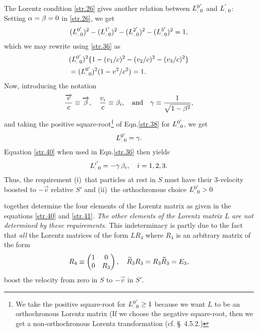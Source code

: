 \begin{small}
The Lorentz condition \eqref{str.26} gives another 
relation between ${{L}^{0'}_{.\;0}}$ and ${{L}^{'}_{.\;0}}$: 
Setting ${\alpha}={\beta}=0$ in \eqref{str.26}, we get
\begin{align}\label{str.37}
 ({{L}^{0'}_{.\;0}})^2
-({{L}^{1'}_{.\;0}})^2-({{L}^{2'}_{.\;0}})^2
-({{L}^{3'}_{.\;0}})^2=1,
\end{align}
which we may rewrite using \eqref{str.36} as
\begin{align}\label{str.38}
&({{L}^{0'}_{.\;0}})^2 
\{1-(v_1/c)^2-(v_2/c)^2-(v_3/c)^2\}\notag\\
&=({{L}^{0'}_{.\;0}})^2 (1-v^2/c^2)=1.
\end{align}
Now, introducing the notation
\begin{align}\label{str.39}
\frac{\overrightarrow{v}}{c}\equiv \overrightarrow{{\beta}},  \quad
\frac{v_i}{c} \equiv{\beta}_i, \quad \text{and} \quad 
{\gamma}\equiv \frac{1}{\sqrt{1-{\beta}^2}},
\end{align}
and taking the positive square-root\footnote{We take the 
positive square-root for ${{L}^{0'}_{.\;0}}\geq1$ because we 
want $L$ to be an orthochronous Lorentz matrix (If we 
choose the negative square-root, then we get a 
non-orthochronous Lorentz transformation (cf. \S~4.5.2.)} 
of Eqn.\eqref{str.38} for 
${{L}^{0'}_{.\;0}}$, we get
\begin{align}\label{str.40}
{\ensuremath{{L}^{0'}_{.\;0}}}={\gamma}.
\end{align} 
Equation \eqref{str.40} when used in Eqn.\eqref{str.36} 
then yields
\begin{align}\label{str.41}
{\ensuremath{{L}^{i'}_{.\;0}}} =-{\gamma}\,{\beta}_i,\quad i=1,2,3.
\end{align}
Thus, the  requirement (i)~that particles at rest in  $S$ 
must have their 3-velocity boosted to $-\vec{v}$ relative  
$S'$ and (ii)~the orthochronous choice  ${{L}^{0'}_{.\;0}}>0$ 
 
together determine the four elements of the Lorentz matrix 
as given in the equations \eqref{str.40} and 
\eqref{str.41}. 
\textsl{The other elements of the Lorentz matrix $L$ 
are \textsl{not} determined by these requirements.} This 
indeterminacy is partly due to the fact that \textsl{all} 
the Lorentz matrices of the form $LR_4$ where $R_4$ is an 
arbitrary matrix of the form
\begin{align}\label{str.42}
R_4 \equiv\begin{pmatrix}
1&0\\0&R_3\end{pmatrix},
\quad \widetilde{R}_3R_3 =R_3\widetilde{R}_3=E_3,
\end{align}
boost the velocity from zero in  $S$ to $-\vec{v} $ in  
$S'$. 


\end{small}
